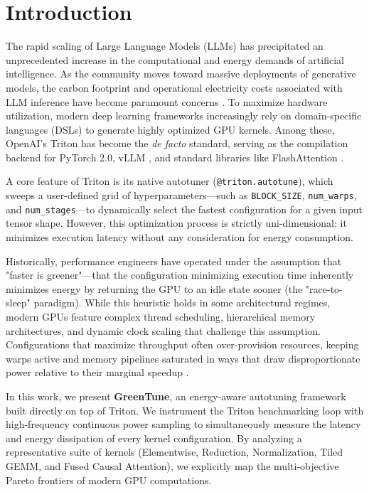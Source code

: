 \section{Introduction}
The rapid scaling of Large Language Models (LLMs) has precipitated an unprecedented increase in the computational and energy demands of artificial intelligence. As the community moves toward massive deployments of generative models, the carbon footprint and operational electricity costs associated with LLM inference have become paramount concerns \cite{schwartz2020greenai, samsi2023words}. To maximize hardware utilization, modern deep learning frameworks increasingly rely on domain-specific languages (DSLs) to generate highly optimized GPU kernels. Among these, OpenAI's Triton \cite{tillet2019triton} has become the \textit{de facto} standard, serving as the compilation backend for PyTorch 2.0, vLLM \cite{kwon2023pagedattention}, and standard libraries like FlashAttention \cite{dao2022flashattention}. 

A core feature of Triton is its native autotuner (\texttt{@triton.autotune}), which sweeps a user-defined grid of hyperparameters---such as \texttt{BLOCK\_SIZE}, \texttt{num\_warps}, and \texttt{num\_stages}---to dynamically select the fastest configuration for a given input tensor shape. However, this optimization process is strictly uni-dimensional: it minimizes execution latency without any consideration for energy consumption. 

Historically, performance engineers have operated under the assumption that "faster is greener"---that the configuration minimizing execution time inherently minimizes energy by returning the GPU to an idle state sooner (the "race-to-sleep" paradigm). While this heuristic holds in some architectural regimes, modern GPUs feature complex thread scheduling, hierarchical memory architectures, and dynamic clock scaling that challenge this assumption. Configurations that maximize throughput often over-provision resources, keeping warps active and memory pipelines saturated in ways that draw disproportionate power relative to their marginal speedup \cite{kernelpro2026, flipflop2026}.

In this work, we present \textbf{GreenTune}, an energy-aware autotuning framework built directly on top of Triton. We instrument the Triton benchmarking loop with high-frequency continuous power sampling to simultaneously measure the latency and energy dissipation of every kernel configuration. By analyzing a representative suite of kernels (Elementwise, Reduction, Normalization, Tiled GEMM, and Fused Causal Attention), we explicitly map the multi-objective Pareto frontiers of modern GPU computations.

